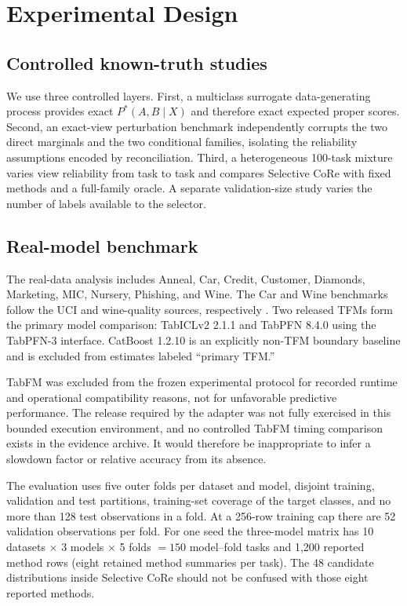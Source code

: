 \documentclass[a4paper,fleqn]{cas-sc}
\begin{document}
\section{Experimental Design}
\subsection{Controlled known-truth studies}
We use three controlled layers. First, a multiclass surrogate data-generating process provides exact $P^*(A,B\mid X)$ and therefore exact expected proper scores. Second, an exact-view perturbation benchmark independently corrupts the two direct marginals and the two conditional families, isolating the reliability assumptions encoded by reconciliation. Third, a heterogeneous 100-task mixture varies view reliability from task to task and compares Selective CoRe with fixed methods and a full-family oracle. A separate validation-size study varies the number of labels available to the selector.

\subsection{Real-model benchmark}
The real-data analysis includes Anneal, Car, Credit, Customer, Diamonds, Marketing, MIC, Nursery, Phishing, and Wine. The Car and Wine benchmarks follow the UCI and wine-quality sources, respectively \citep{bohanec1988car,cortez2009wine}. Two released TFMs form the primary model comparison: TabICLv2 2.1.1 and TabPFN 8.4.0 using the TabPFN-3 interface. CatBoost 1.2.10 is an explicitly non-TFM boundary baseline and is excluded from estimates labeled ``primary TFM.''

TabFM was excluded from the frozen experimental protocol for recorded runtime and operational compatibility reasons, not for unfavorable predictive performance. The release required by the adapter was not fully exercised in this bounded execution environment, and no controlled TabFM timing comparison exists in the evidence archive. It would therefore be inappropriate to infer a slowdown factor or relative accuracy from its absence.

The evaluation uses five outer folds per dataset and model, disjoint training, validation and test partitions, training-set coverage of the target classes, and no more than 128 test observations in a fold. At a 256-row training cap there are 52 validation observations per fold. For one seed the three-model matrix has 10 datasets $\times$ 3 models $\times$ 5 folds $=150$ model--fold tasks and 1,200 reported method rows (eight retained method summaries per task). The 48 candidate distributions inside Selective CoRe should not be confused with those eight reported methods.
\end{document}

